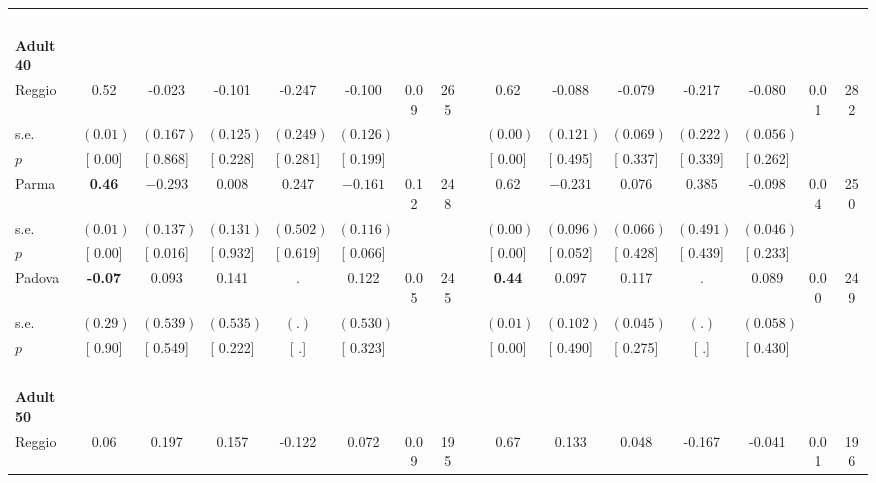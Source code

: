 \begin{longtable}{L{8em} c c c c c c c p{1em} c c c c c c c}
~\\[1em]
\quad \quad \textbf{Adult 40} & & & & & & & & & & & & & & & \\* 
\quad \quad \quad Reggio& 0.52 &    -0.023 &    -0.101 &    -0.247 &    -0.100 &      0.09 &       265 & & 0.62 &    -0.088 &    -0.079 &    -0.217 &    -0.080 &      0.01 &       282  \\*
\quad \quad \quad \quad s.e.& $ (     0.01)$ & $ (    0.167)$ & $ (    0.125)$ & $ (    0.249)$ & $ (    0.126)$ & & & & $ (     0.00)$ & $ (    0.121)$ & $ (    0.069)$ & $ (    0.222)$ & $ (    0.056)$ & &  \\*
\quad \quad \quad \quad $ p$ & [     0.00] & [    0.868] & [    0.228] & [    0.281] & [    0.199] & & & & [     0.00] & [    0.495] & [    0.337] & [    0.339] & [    0.262] & &  \\[1em]
\quad \quad \quad Parma& \textbf{     0.46} & $ \mathbf{   -0.293}$ &     0.008 &     0.247 & $ \mathbf{   -0.161}$ &      0.12 &       248 & & 0.62 & $ \mathbf{   -0.231}$ &     0.076 &     0.385 &    -0.098 &      0.04 &       250  \\*
\quad \quad \quad \quad s.e.& $ (     0.01)$ & $ (    0.137)$ & $ (    0.131)$ & $ (    0.502)$ & $ (    0.116)$ & & & & $ (     0.00)$ & $ (    0.096)$ & $ (    0.066)$ & $ (    0.491)$ & $ (    0.046)$ & &  \\*
\quad \quad \quad \quad $ p$ & [     0.00] & [    0.016] & [    0.932] & [    0.619] & [    0.066] & & & & [     0.00] & [    0.052] & [    0.428] & [    0.439] & [    0.233] & &  \\[1em]
\quad \quad \quad Padova& \textbf{    -0.07} &     0.093 &     0.141 &         . &     0.122 &      0.05 &       245 & & \textbf{     0.44} &     0.097 &     0.117 &         . &     0.089 &      0.00 &       249  \\*
\quad \quad \quad \quad s.e.& $ (     0.29)$ & $ (    0.539)$ & $ (    0.535)$ & $ (        .)$ & $ (    0.530)$ & & & & $ (     0.01)$ & $ (    0.102)$ & $ (    0.045)$ & $ (        .)$ & $ (    0.058)$ & &  \\*
\quad \quad \quad \quad $ p$ & [     0.90] & [    0.549] & [    0.222] & [        .] & [    0.323] & & & & [     0.00] & [    0.490] & [    0.275] & [        .] & [    0.430] & &  \\[1em]
~\\[1em]
\quad \quad \textbf{Adult 50} & & & & & & & & & & & & & & & \\* 
\quad \quad \quad Reggio& 0.06 &     0.197 &     0.157 &    -0.122 &     0.072 &      0.09 &       195 & & 0.67 &     0.133 &     0.048 &    -0.167 &    -0.041 &      0.01 &       196  \\*

\end{longtable}
